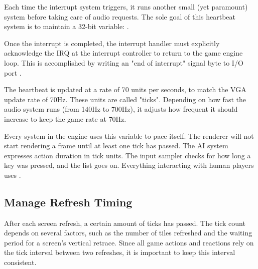 \documentclass[book.tex]{subfiles}
\begin{document}
\bigskip
\par
\begin{minipage}{\textwidth}

\end{minipage}
\par
\begin{minipage}{\textwidth}

\end{minipage}

\par
Each time the interrupt system triggers, it runs another small (yet paramount) system before taking care of audio requests. The sole goal of this heartbeat system is to maintain a 32-bit variable: .\\

\par
\begin{minipage}{\textwidth}

\end{minipage}

\par
Once the interrupt is completed, the interrupt handler must explicitly acknowledge the IRQ at the interrupt controller to return to the game engine loop. This is accomplished by writing an "end of interrupt" signal byte to I/O port .\\

\par
The heartbeat is updated at a rate of 70 units per seconds, to match the VGA update rate of 70Hz. These units are called "ticks". Depending on how fast the audio system runs (from 140Hz to 700Hz), it adjusts how frequent it should increase  to keep the game rate at 70Hz.\\

\par
Every system in the engine uses this variable to pace itself. The renderer will not start rendering a frame until at least one tick has passed. The AI system expresses action duration in tick units. The input sampler checks for how long a key was pressed, and the list goes on. Everything interacting with human players uses .


\subsection{Manage Refresh Timing}
After each screen refresh, a certain amount of ticks has passed. The tick count depends on several factors, such as the number of tiles refreshed and the waiting period for a screen's vertical retrace. Since all game actions and reactions rely on the tick interval between two refreshes, it is important to keep this interval consistent.\\
\end{document}
